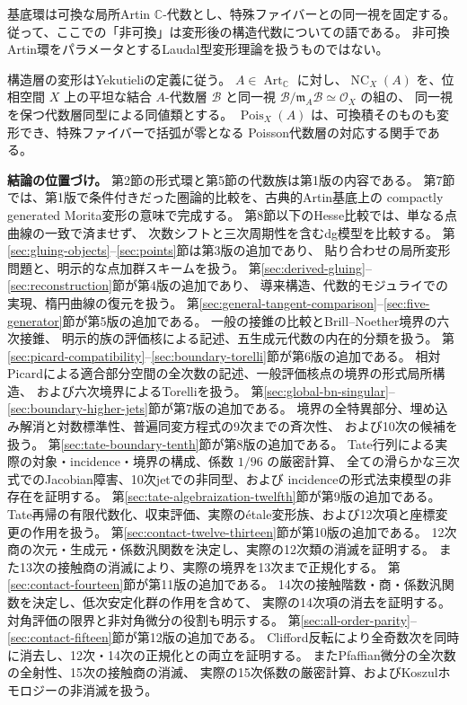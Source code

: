 \documentclass[a4paper,11pt]{ltjsarticle}
\newcommand{\mathscr}{\mathcal}
\theoremstyle{definition}
\newcommand{\CC}{\mathbb C}
\newcommand{\OO}{\mathcal O}
\newcommand{\Art}{\operatorname{Art}_{\CC}}
\newcommand{\NC}{\operatorname{NC}}
\newcommand{\Pois}{\operatorname{Pois}}
\newcommand{\frakm}{\mathfrak m}
\begin{document}
基底環は可換な局所Artin $\CC$-代数とし、特殊ファイバーとの同一視を固定する。
従って、ここでの「非可換」は変形後の構造代数についての語である。
非可換Artin環をパラメータとするLaudal型変形理論を扱うものではない。

構造層の変形はYekutieliの定義\cite[Definitions 2.7--2.8]{Yek}に従う。
$A\in\Art$ に対し、$\NC_X(A)$ を、位相空間 $X$ 上の平坦な結合 $A$-代数層
$\mathscr B$ と同一視 $\mathscr B/\frakm_A\mathscr B\simeq\OO_X$ の組の、
同一視を保つ代数層同型による同値類とする。
$\Pois_X(A)$ は、可換積そのものも変形でき、特殊ファイバーで括弧が零となる
Poisson代数層の対応する関手である。

\medskip
\noindent\textbf{結論の位置づけ。}
第2節の形式環と第5節の代数族は第1版の内容である。
第7節では、第1版で条件付きだった圏論的比較を、古典的Artin基底上の
compactly generated Morita変形の意味で完成する。
第8節以下のHesse比較では、単なる点曲線の一致で済ませず、
次数シフトと三次周期性を含むdg模型を比較する。
第\ref{sec:gluing-objects}--\ref{sec:points}節は第3版の追加であり、
貼り合わせの局所変形問題と、明示的な点加群スキームを扱う。
第\ref{sec:derived-gluing}--\ref{sec:reconstruction}節が第4版の追加であり、
導来構造、代数的モジュライでの実現、楕円曲線の復元を扱う。
第\ref{sec:general-tangent-comparison}--\ref{sec:five-generator}節が第5版の追加である。
一般の接錐の比較とBrill--Noether境界の六次接錐、
明示的族の評価核による記述、五生成元代数の内在的分類を扱う。
第\ref{sec:picard-compatibility}--\ref{sec:boundary-torelli}節が第6版の追加である。
相対Picardによる適合部分空間の全次数の記述、一般評価核点の境界の形式局所構造、
および六次境界によるTorelliを扱う。
第\ref{sec:global-bn-singular}--\ref{sec:boundary-higher-jets}節が第7版の追加である。
境界の全特異部分、埋め込み解消と対数標準性、普遍同変方程式の9次までの斉次性、
および10次の候補を扱う。
第\ref{sec:tate-boundary-tenth}節が第8版の追加である。
Tate行列による実際の対象・incidence・境界の構成、係数 $1/96$ の厳密計算、
全ての滑らかな三次式でのJacobian障害、10次jetでの非同型、および
incidenceの形式法束模型の非存在を証明する。
第\ref{sec:tate-algebraization-twelfth}節が第9版の追加である。
Tate再帰の有限代数化、収束評価、実際のétale変形族、および12次項と座標変更の作用を扱う。
第\ref{sec:contact-twelve-thirteen}節が第10版の追加である。
12次商の次元・生成元・係数汎関数を決定し、実際の12次類の消滅を証明する。
また13次の接触商の消滅により、実際の境界を13次まで正規化する。
第\ref{sec:contact-fourteen}節が第11版の追加である。
14次の接触階数・商・係数汎関数を決定し、低次安定化群の作用を含めて、
実際の14次項の消去を証明する。対角評価の限界と非対角微分の役割も明示する。
第\ref{sec:all-order-parity}--\ref{sec:contact-fifteen}節が第12版の追加である。
Clifford反転により全奇数次を同時に消去し、12次・14次の正規化との両立を証明する。
またPfaffian微分の全次数の全射性、15次の接触商の消滅、
実際の15次係数の厳密計算、およびKoszulホモロジーの非消滅を扱う。
\end{document}
